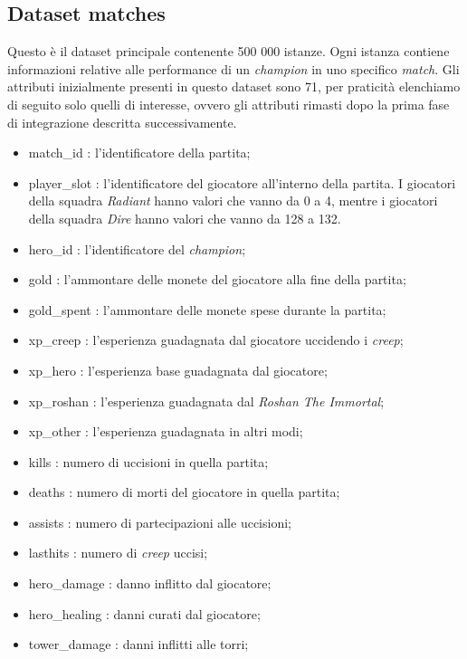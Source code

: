 \documentclass[a4paper,12pt,openany,oneside]{book}
\begin{document}
\subsection{Dataset matches}\label{subsection:matches}
Questo è il dataset principale contenente 500 000 istanze. Ogni istanza contiene informazioni relative alle performance di un \textit{champion} in uno specifico \textit{match}. Gli attributi inizialmente presenti in questo dataset sono 71, per praticità elenchiamo di seguito solo quelli di interesse, ovvero gli attributi rimasti dopo la prima fase di integrazione descritta successivamente.
\begin{itemize}
	\item match\_id	: l'identificatore della partita;
	\item player\_slot : l'identificatore del giocatore all'interno della partita. I giocatori della squadra \textit{Radiant} hanno valori che vanno da 0 a 4, mentre i giocatori della squadra \textit{Dire} hanno valori che vanno da 128 a 132.
	\item hero\_id : l'identificatore del \textit{champion};
	\item gold : l'ammontare delle monete del giocatore alla fine della partita;
	\item gold\_spent : l'ammontare delle monete spese durante la partita;
	\item xp\_creep : l'esperienza guadagnata dal giocatore uccidendo i \textit{creep};
	\item xp\_hero : l'esperienza base guadagnata dal giocatore;
	\item xp\_roshan : l'esperienza guadagnata dal \textit{Roshan The Immortal};
	\item xp\_other : l'esperienza guadagnata in altri modi;
	\item kills : numero di uccisioni in quella partita;
	\item deaths : numero di morti del giocatore in quella partita;
	\item assists : numero di partecipazioni alle uccisioni; 
	\item lasthits : numero di \textit{creep} uccisi;
	\item hero\_damage : danno inflitto dal giocatore;
	\item hero\_healing : danni curati dal giocatore;
	\item tower\_damage : danni inflitti alle torri;
\end{itemize}
\end{document}
